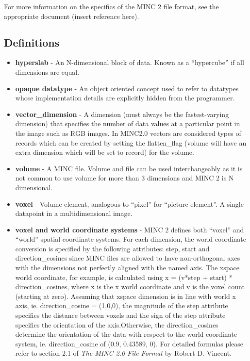 \documentclass{article}
\begin{document}
For more information on the specifics of the MINC 2 file format, see the
appropriate document (insert reference here).

\subsection{Definitions}
\begin{itemize}
\item {\bf hyperslab} - An N-dimensional block of data.  Known as a
``hypercube'' if all dimensions are equal.
\item {\bf opaque datatype} - An object oriented concept used to refer
to datatypes whose implementation details are explicitly hidden from
the programmer.
\item {\bf vector\_dimension} - A dimension (must always be the fastest-varying
dimension) that specifies the number of data values at a particular 
point in the image such as RGB images. In MINC2.0 vectors are considered types 
of records which can be created by setting the flatten\_flag (volume will have 
an extra dimension which will be set to record) for the volume.
\item {\bf volume} - A MINC file. Volume and file can be used interchangeably
as it is not common to use volume for more than
3 dimensions and MINC 2 is N dimensional.
\item {\bf voxel} - Volume element, analogous to ``pixel'' for ``picture
element''. A single datapoint in a multidimensional image.
\item {\bf voxel and world coordinate systems} -
MINC 2 defines both ``voxel'' and ``world'' spatial coordinate systems.
For each dimension, the world coordinate conversion is specified  
by the following attributes: step, start and direction\_cosines since 
MINC files are allowed to have non-orthogonal axes with the dimensions 
not perfectly aligned with the named axis. The xspace world coordinate, for
example, is calculated using x = (v*step + start) * direction\_cosines, 
where x is the x world coordinate and v is the voxel count (starting at zero). 
Assuming that xspace dimension is in line with world x axis, ie. direction\_cosine = (1,0,0), the magnitude of the step attribute specifies the distance between voxels and the sign of the step attribute specifies the orientation of the axis.Otherwise, the direction\_cosines determine the orientation of the data with 
respect to the world coordinate system, ie. direction\_cosine of (0.9, 0.43589, 0). For detailed formulas please refer to section 2.1 of
\emph{The MINC 2.0 File Format} by Robert D. Vincent.
\end{itemize}
\newpage
\end{document}
